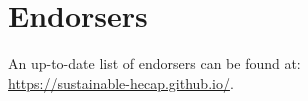 \documentclass[../SustainableHEP.tex]{subfiles}
\begin{document}
\newpage


\section*{Endorsers}
{}

An up-to-date list of endorsers can be found at:\\ \url{https://sustainable-hecap.github.io/}.\\
\bigskip
\end{document}
